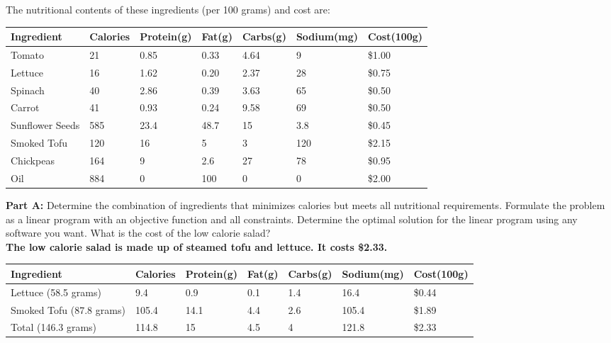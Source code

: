 \documentclass{article}
\begin{document}
The nutritional contents of these ingredients (per 100 grams) and cost are:

\begin{flushleft}
 \begin{tabular}{|| l | l | l | l | l | l | l ||}
 \hline
 Ingredient & Calories & Protein(g) & Fat(g) & Carbs(g) & Sodium(mg) & Cost(100g)\\ 
 \hline\hline
 Tomato & 21 & 0.85 & 0.33 & 4.64 & 9 & \$1.00 \\ 
 \hline
 Lettuce & 16 & 1.62 & 0.20 & 2.37 & 28 & \$0.75 \\ 
 \hline
 Spinach & 40 & 2.86 & 0.39 & 3.63 & 65 & \$0.50 \\ 
 \hline
 Carrot & 41 & 0.93 & 0.24 & 9.58 & 69 & \$0.50 \\ 
 \hline
 Sunflower Seeds & 585 & 23.4 & 48.7 & 15 & 3.8 & \$0.45 \\ 
 \hline
 Smoked Tofu & 120 & 16 & 5 & 3 & 120 & \$2.15 \\ 
 \hline
 Chickpeas & 164 & 9 & 2.6 & 27 & 78 & \$0.95 \\ 
 \hline
 Oil & 884 & 0 & 100 & 0 & 0 & \$2.00 \\ 
 \hline
\end{tabular}
\end{flushleft}

\noindent \textbf{Part A: }Determine the combination of ingredients that minimizes calories but meets all nutritional requirements. Formulate the problem as a linear program with an objective function and all constraints. Determine the optimal solution for the linear program using any software you want. What is the cost of the low calorie salad?
\\[.25cm]
\textbf{The low calorie salad is made up of steamed tofu and lettuce. It costs \$2.33.}
\begin{flushleft}
 \begin{tabular}{|| l | l | l | l | l | l | l ||}
 \hline
 Ingredient & Calories & Protein(g) & Fat(g) & Carbs(g) & Sodium(mg) & Cost(100g)\\ 
 \hline\hline
 Lettuce (58.5 grams) & 9.4 & 0.9 & 0.1 & 1.4 & 16.4 & \$0.44 \\ 
 \hline
 Smoked Tofu (87.8 grams) & 105.4 & 14.1 & 4.4 & 2.6 & 105.4 & \$1.89 \\ 
 \hline
 Total (146.3 grams) & 114.8 & 15 & 4.5 & 4 & 121.8 & \$2.33 \\ 
 \hline
\end{tabular}
\end{flushleft}
\end{document}

